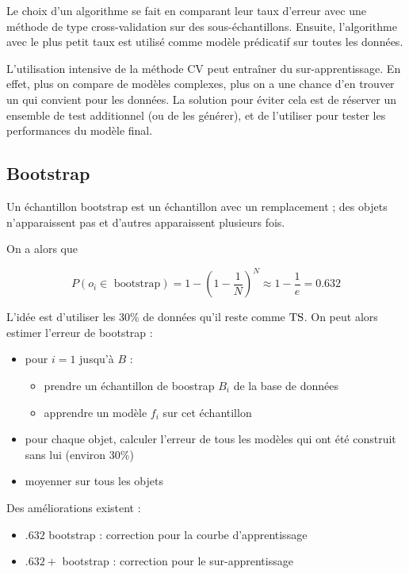 	Le choix d'un algorithme se fait en comparant leur taux d'erreur avec une méthode de type cross-validation sur des sous-échantillons. Ensuite, l'algorithme avec le plus petit taux est utilisé comme modèle prédicatif sur toutes les données.

	L'utilisation intensive de la méthode CV peut entraîner du sur-apprentissage. En effet, plus on compare de modèles complexes, plus on a une chance d'en trouver un qui convient pour les données. La solution pour éviter cela est de réserver un ensemble de test additionnel (ou de les générer), et de l'utiliser pour tester les performances du modèle final.
	
	\subsection{Bootstrap}
	
	Un échantillon bootstrap est un échantillon avec un remplacement ; des objets n'apparaissent pas et d'autres apparaissent plusieurs fois.
	
	
	On a alors que
	
	$$P(o_i \in \text{ bootstrap}) = 1 - (1 - \frac{1}{N})^N \approx 1 - \frac{1}{e} = 0.632$$
	
	L'idée est d'utiliser les 30\% de données qu'il reste comme $\text{TS}$. On peut alors estimer l'erreur de bootstrap :
	
	\begin{itemize}
		\item pour $i = 1$ jusqu'à $B$ :
		
		\begin{itemize}
			\item prendre un échantillon de boostrap $B_i$ de la base de données
			\item apprendre un modèle $f_i$ sur cet échantillon
		\end{itemize}
		
		\item pour chaque objet, calculer l'erreur de tous les modèles qui ont été construit sans lui (environ 30\%)
		\item moyenner sur tous les objets
	\end{itemize}
	
	Des améliorations existent :
	
	\begin{itemize}
		\item $.632$ bootstrap : correction pour la courbe d'apprentissage
		\item $.632+$ bootstrap : correction pour le sur-apprentissage
	\end{itemize}
	
